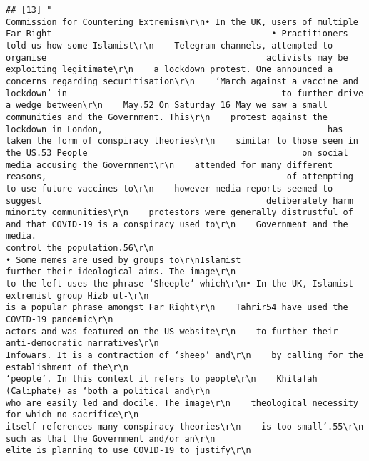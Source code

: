 \documentclass[
]{book}
\begin{document}
\begin{verbatim}
## [13] "                                                     Commission for Countering Extremism\r\n• In the UK, users of multiple Far Right                                           • Practitioners told us how some Islamist\r\n    Telegram channels, attempted to organise                                           activists may be exploiting legitimate\r\n    a lockdown protest. One announced a                                                concerns regarding securitisation\r\n    ‘March against a vaccine and lockdown’ in                                          to further drive a wedge between\r\n    May.52 On Saturday 16 May we saw a small                                           communities and the Government. This\r\n    protest against the lockdown in London,                                            has taken the form of conspiracy theories\r\n    similar to those seen in the US.53 People                                          on social media accusing the Government\r\n    attended for many different reasons,                                               of attempting to use future vaccines to\r\n    however media reports seemed to suggest                                            deliberately harm minority communities\r\n    protestors were generally distrustful of                                           and that COVID-19 is a conspiracy used to\r\n    Government and the media.                                                          control the population.56\r\n                                                                                   • Some memes are used by groups to\r\nIslamist                                                                               further their ideological aims. The image\r\n                                                                                       to the left uses the phrase ‘Sheeple’ which\r\n• In the UK, Islamist extremist group Hizb ut-\r\n                                                                                       is a popular phrase amongst Far Right\r\n    Tahrir54 have used the COVID-19 pandemic\r\n                                                                                       actors and was featured on the US website\r\n    to further their anti-democratic narratives\r\n                                                                                       Infowars. It is a contraction of ‘sheep’ and\r\n    by calling for the establishment of the\r\n                                                                                       ‘people’. In this context it refers to people\r\n    Khilafah (Caliphate) as ‘both a political and\r\n                                                                                       who are easily led and docile. The image\r\n    theological necessity for which no sacrifice\r\n                                                                                       itself references many conspiracy theories\r\n    is too small’.55\r\n                                                                                       such as that the Government and/or an\r\n                                                                                       elite is planning to use COVID-19 to justify\r\n                                                
\end{verbatim}
\end{document}
